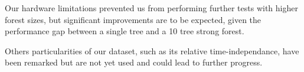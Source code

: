 \documentclass[a4paper,10pt]{article}
\begin{document}
  Our hardware limitations prevented us from performing further tests with higher forest sizes, but significant improvements are to be expected, given the  performance gap between a single tree and a 10 tree strong forest.

  Others particularities of our dataset, such as its relative time-independance, have been remarked but are not yet used and could lead to further progress.

%
%
%
%
%
%
%
%
%
%
%
%
%
%
%
%
\end{document}
